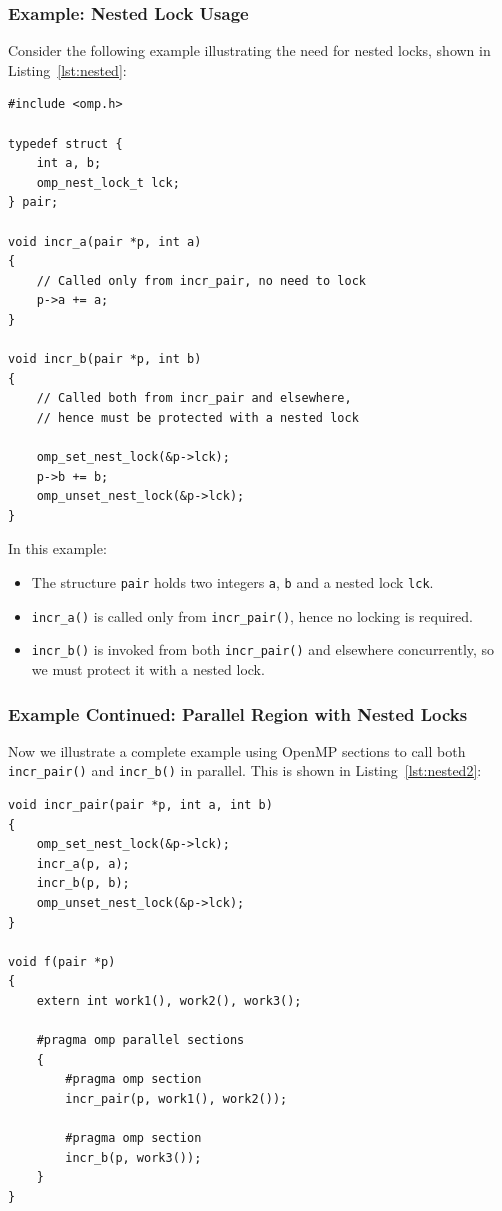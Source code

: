 \documentclass[12pt]{book}
\begin{document}
\subsubsection*{Example: Nested Lock Usage}

Consider the following example illustrating the need for nested locks, shown in Listing~\ref{lst:nested}:

\begin{lstlisting}[style=cppstyle, caption={Nested lock — Function design},captionpos=b,label={lst:nested}]
#include <omp.h>

typedef struct {
    int a, b;
    omp_nest_lock_t lck;
} pair;

void incr_a(pair *p, int a)
{
    // Called only from incr_pair, no need to lock
    p->a += a;
}

void incr_b(pair *p, int b)
{
    // Called both from incr_pair and elsewhere,
    // hence must be protected with a nested lock

    omp_set_nest_lock(&p->lck);
    p->b += b;
    omp_unset_nest_lock(&p->lck);
}
\end{lstlisting}

In this example:
\begin{itemize}
    \item The structure \texttt{pair} holds two integers \texttt{a}, \texttt{b} and a nested lock \texttt{lck}.
    \item \texttt{incr\_a()} is called only from \texttt{incr\_pair()}, hence no locking is required.
    \item \texttt{incr\_b()} is invoked from both \texttt{incr\_pair()} and elsewhere concurrently, so we must protect it with a nested lock.
\end{itemize}

\subsubsection*{Example Continued: Parallel Region with Nested Locks}

Now we illustrate a complete example using OpenMP sections to call both \texttt{incr\_pair()} and \texttt{incr\_b()} in parallel. This is shown in Listing~\ref{lst:nested2}:

\begin{lstlisting}[style=cppstyle, caption={Nested lock — Parallel sections},captionpos=b,label={lst:nested2}]
void incr_pair(pair *p, int a, int b)
{
    omp_set_nest_lock(&p->lck);
    incr_a(p, a);
    incr_b(p, b);
    omp_unset_nest_lock(&p->lck);
}

void f(pair *p)
{
    extern int work1(), work2(), work3();

    #pragma omp parallel sections
    {
        #pragma omp section
        incr_pair(p, work1(), work2());

        #pragma omp section
        incr_b(p, work3());
    }
}
\end{lstlisting}
\end{document}
